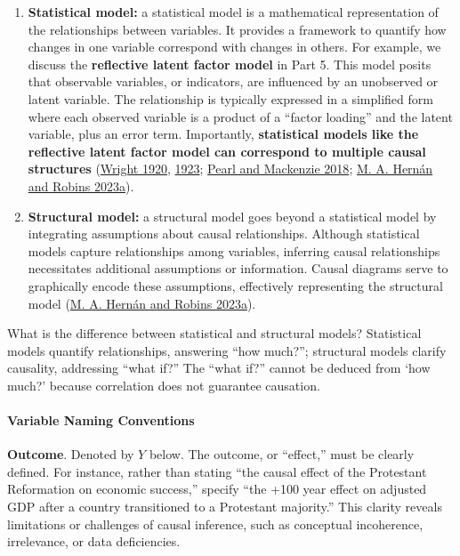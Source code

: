 \documentclass[
  singlecolumn]{article}
\let\oldparagraph\paragraph
\renewcommand{\paragraph}[1]{\oldparagraph{#1}\mbox{}}
\begin{document}
\begin{enumerate}
\def\labelenumi{\arabic{enumi}.}
\setcounter{enumi}{15}
\item
  \textbf{Statistical model:} a statistical model is a mathematical
  representation of the relationships between variables. It provides a
  framework to quantify how changes in one variable correspond with
  changes in others. For example, we discuss the \textbf{reflective
  latent factor model} in Part 5. This model posits that observable
  variables, or indicators, are influenced by an unobserved or latent
  variable. The relationship is typically expressed in a simplified form
  where each observed variable is a product of a ``factor loading'' and
  the latent variable, plus an error term. Importantly,
  \textbf{statistical models like the reflective latent factor model can
  correspond to multiple causal structures}
  (\protect\hyperlink{ref-wright1920}{Wright 1920},
  \protect\hyperlink{ref-wright1923}{1923};
  \protect\hyperlink{ref-pearl2018}{Pearl and Mackenzie 2018};
  \protect\hyperlink{ref-hernuxe1n2023}{M. A. Hernán and Robins 2023a}).
\item
  \textbf{Structural model:} a structural model goes beyond a
  statistical model by integrating assumptions about causal
  relationships. Although statistical models capture relationships among
  variables, inferring causal relationships necessitates additional
  assumptions or information. Causal diagrams serve to graphically
  encode these assumptions, effectively representing the structural
  model (\protect\hyperlink{ref-hernuxe1n2023}{M. A. Hernán and Robins
  2023a}).
\end{enumerate}

What is the difference between statistical and structural models?
Statistical models quantify relationships, answering ``how much?'';
structural models clarify causality, addressing ``what if?'' The ``what
if?'' cannot be deduced from `how much?' because correlation does not
guarantee causation.

\hypertarget{variable-naming-conventions}{%
\paragraph{Variable Naming
Conventions}\label{variable-naming-conventions}}

\textbf{Outcome}. Denoted by \(Y\) below. The outcome, or ``effect,''
must be clearly defined. For instance, rather than stating ``the causal
effect of the Protestant Reformation on economic success,'' specify
``the +100 year effect on adjusted GDP after a country transitioned to a
Protestant majority.'' This clarity reveals limitations or challenges of
causal inference, such as conceptual incoherence, irrelevance, or data
deficiencies.
\end{document}
